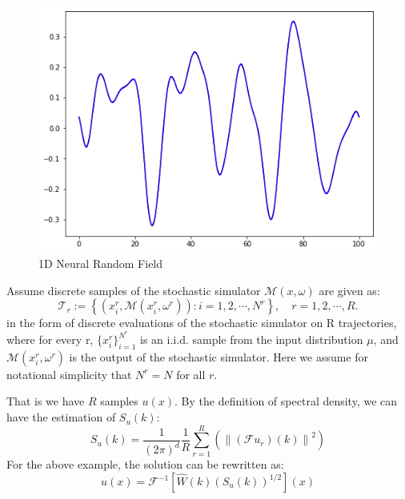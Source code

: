 \documentclass{article}
\begin{document}
\begin{figure}[H]
\begin{minipage}[t]{0.3\textwidth}
    \caption*{$\nu = 2, \kappa = 1$}
  \end{minipage}
  \begin{minipage}[t]{0.3\textwidth}
    \centering
    \includegraphics[width=\textwidth]{./pics/1D_NeuralRF_4096_100.0_10_1.png}  %
    \caption*{$\nu = 10, \kappa = 1$}
  \end{minipage}

    \caption{1D Neural Random Field}
    \label{1dnrf}
\end{figure}


Assume discrete samples of the stochastic simulator $\mathcal{M}(x, \omega)$ are given as:
\begin{equation}
	\mathcal{T}_r :=\left\{\left(x_i^r, \mathcal{M}(x_i^r, \omega^r)\right): i=1,2,\cdots,N^r\right\}, \quad r=1,2,\cdots,R.
\end{equation}
in the form of discrete evaluations of the stochastic simulator on R trajectories, where for
every r, $\{x_i^r\}_{i=1}^{N^r}$ is an i.i.d. sample from the input distribution $\mu$, and $\mathcal{M}(x_i^r, \omega^r)$ is the output of the stochastic simulator.
Here we assume for notational simplicity that $N^r = N$ for all $r$.

That is we have $R$ samples $u(x)$. By the definition of spectral density, we can have the estimation of $S_u(k)$:
\begin{equation}
    S_u(k) = \frac{1}{(2\pi)^d}\frac{1}{R}\sum_{r=1}^R\left(\left\|(\mathcal{F}u_r)(k)\right\|^2\right)
\end{equation}
For the above example, the solution can be rewritten as:
\begin{equation}
    u(x) = \mathcal{F}^{-1}\left[\hat{W}(k)(S_u(k))^{1/2}\right](x)
\end{equation}
\end{document}
